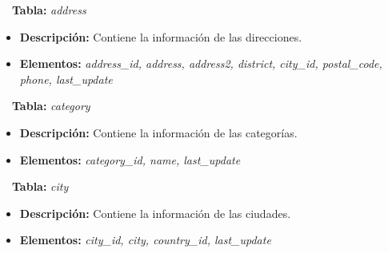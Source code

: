 \documentclass{report}
\begin{document}
\CIRCLE \ \ \textbf{Tabla:} \emph{address}
\begin{itemize}
  \item \textbf{Descripción:} Contiene la información de las direcciones.
  \item \textbf{Elementos:} \emph{address\_id, address, address2, district, city\_id, postal\_code, phone, last\_update}
\end{itemize}

\CIRCLE \ \ \textbf{Tabla:} \emph{category}
\begin{itemize}
  \item \textbf{Descripción:} Contiene la información de las categorías.
  \item \textbf{Elementos:} \emph{category\_id, name, last\_update}
\end{itemize}

\CIRCLE \ \ \textbf{Tabla:} \emph{city}
\begin{itemize}
  \item \textbf{Descripción:} Contiene la información de las ciudades.
  \item \textbf{Elementos:} \emph{city\_id, city, country\_id, last\_update}
\end{itemize}

\end{document}
